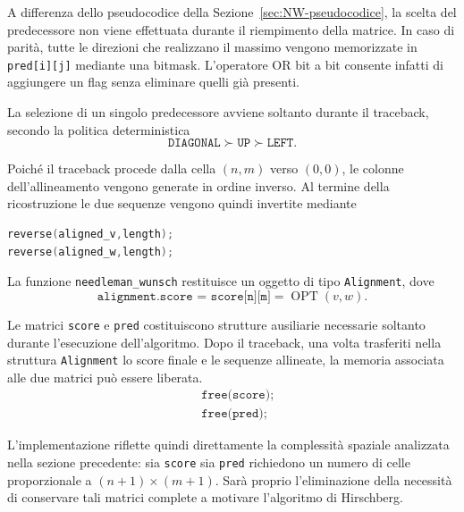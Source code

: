 A differenza dello pseudocodice della Sezione~\ref{sec:NW-pseudocodice}, la scelta del predecessore non viene effettuata durante il riempimento della matrice.
In caso di parità, tutte le direzioni che realizzano il massimo vengono memorizzate in \texttt{pred[i][j]} mediante una bitmask.
L'operatore OR bit a bit consente infatti di aggiungere un flag senza eliminare quelli già presenti.

La selezione di un singolo predecessore avviene soltanto durante il traceback, secondo la politica deterministica
\[
    \texttt{DIAGONAL} \succ \texttt{UP} \succ \texttt{LEFT}.
\]

Poiché il traceback procede dalla cella $(n,m)$ verso $(0,0)$, le colonne dell'allineamento vengono generate in ordine inverso.
Al termine della ricostruzione le due sequenze vengono quindi invertite mediante
\begin{lstlisting}[language=C]
reverse(aligned_v,length);
reverse(aligned_w,length);
\end{lstlisting}

La funzione \texttt{needleman\_wunsch} restituisce un oggetto di tipo \texttt{Alignment}, dove
\[
    \texttt{alignment.score = score[n][m]} = \operatorname{OPT}(v,w).
\]

Le matrici \texttt{score} e \texttt{pred} costituiscono strutture ausiliarie necessarie soltanto durante l'esecuzione dell'algoritmo.
Dopo il traceback, una volta trasferiti nella struttura \texttt{Alignment} lo score finale e le sequenze allineate, la memoria associata alle due matrici può essere liberata.
\[
    \begin{aligned}
        & \texttt{free(score);}\\
        & \texttt{free(pred);}
    \end{aligned}
\]

L'implementazione riflette quindi direttamente la complessità spaziale analizzata nella sezione precedente:
sia \texttt{score} sia \texttt{pred} richiedono un numero di celle proporzionale a $(n+1) \times (m+1)$.
Sarà proprio l'eliminazione della necessità di conservare tali matrici complete a motivare l'algoritmo di Hirschberg.
